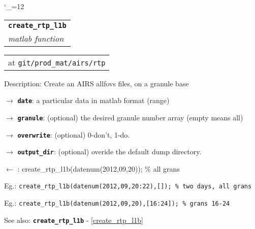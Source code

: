 \documentclass[12pt]{article}
\newcommand{\funcname}{\begingroup \catcode`_=12 \funcnameIn}
\newcommand{\funcnameIn}[2]{
\begin{tabular}{l}
{\Large\bf \texttt{#1}\label{#1}}\\
{\small\it #2}\\ 
\end{tabular}
}
\newcommand{\location}[1]{
\begin{tabular}{l}
{\large at} \texttt{#1}
\end{tabular}
}
\renewcommand{\description}[1]{
Description: #1
}
\newcommand{\inputargs}[2]{
$\rightarrow$
{\bf \texttt{#1}}: {#2} 
}
\newcommand{\outputargs}[2]{
$\leftarrow$
{\bf \texttt{#1}}: {#2}
}
\newcommand{\example}[1]{
Eg.: \texttt{#1}
}
\newcommand{\seealso}[1]{
See also: {\bf \texttt{#1}} - \ref{#1}
}
\begin{document}
\funcname{create_rtp_l1b}{matlab function}

\location{git/prod_mat/airs/rtp}

\description{Create an AIRS allfovs files, on a granule base}

\inputargs{date}{a particular data in matlab format (range)}

\inputargs{granule}{(optional) the desired granule number array (empty means all)}

\inputargs{overwrite}{(optional) 0-don't, 1-do.}

\inputargs{output_dir}{(optional) overide the default dump directory.}

\outputargs{}



\example{create_rtp_l1b(datenum(2012,09,20)); \% all grans}

\example{create_rtp_l1b(datenum(2012,09,20:22),[]);  \% two days, all grans}

\example{create_rtp_l1b(datenum(2012,09,20),[16:24]); \% grans 16-24}

\seealso{create_rtp_l1b}
\end{document}
